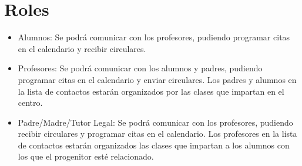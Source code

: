 	\section{Roles}
		\begin{itemize}
			\item Alumnos: Se podrá comunicar con los profesores, pudiendo programar citas en el calendario y recibir circulares.
			\item Profesores: Se podrá comunicar con los alumnos y padres, pudiendo programar citas en el calendario y enviar circulares. Los padres y alumnos en la lista de contactos estarán organizados por las clases que impartan en el centro.
			\item Padre/Madre/Tutor Legal: Se podrá comunicar con los profesores, pudiendo recibir circulares y programar citas en el calendario. Los profesores en la lista de contactos estarán organizados las clases que impartan a los alumnos con los que el progenitor esté relacionado.
		\end{itemize}
